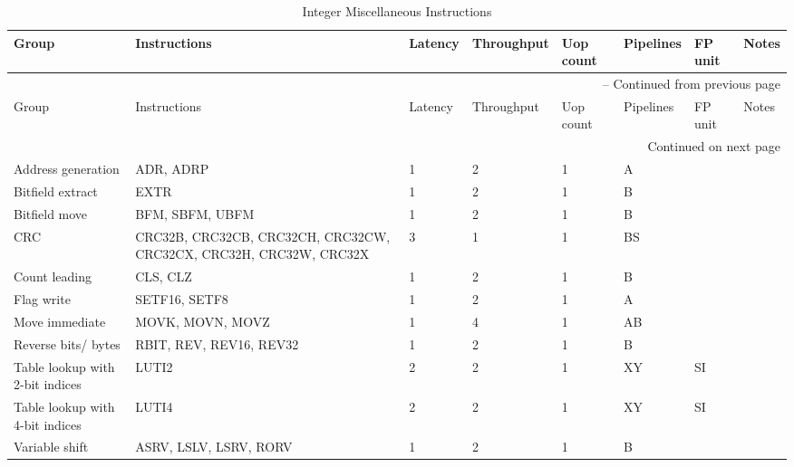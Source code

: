 \begin{longtable}{|p{1in}|p{1in}|l|l|l|p{1in}|l|p{1in}|}
\caption{Integer Miscellaneous Instructions} \\
\hline
Group & Instructions & Latency & Throughput & Uop count & Pipelines & FP unit & Notes\\
\hline
\endfirsthead
\hline
\multicolumn{8}{|r|}{{\tablename\ \thetable{} -- Continued from previous page}} \\
\hline
Group & Instructions & Latency & Throughput & Uop count & Pipelines & FP unit & Notes\\
\hline
\endhead
\hline
\multicolumn{8}{|r|}{{Continued on next page}} \\
\hline
\endfoot
\hline
\endlastfoot
Address generation & ADR, ADRP & 1 & 2 & 1 & A &  & \\
\hline
Bitfield extract & EXTR & 1 & 2 & 1 & B &  & \\
\hline
Bitfield move & BFM, SBFM, UBFM & 1 & 2 & 1 & B &  & \\
\hline
CRC & CRC32B, CRC32CB, CRC32CH, CRC32CW, CRC32CX, CRC32H, CRC32W, CRC32X & 3 & 1 & 1 & BS &  & \\
\hline
Count leading & CLS, CLZ & 1 & 2 & 1 & B &  & \\
\hline
Flag write & SETF16, SETF8 & 1 & 2 & 1 & A &  & \\
\hline
Move immediate & MOVK, MOVN, MOVZ & 1 & 4 & 1 & AB &  & \\
\hline
Reverse bits/ bytes & RBIT, REV, REV16, REV32 & 1 & 2 & 1 & B &  & \\
\hline
Table lookup with 2-bit indices & LUTI2 & 2 & 2 & 1 & XY & SI & \\
\hline
Table lookup with 4-bit indices & LUTI4 & 2 & 2 & 1 & XY & SI & \\
\hline
Variable shift & ASRV, LSLV, LSRV, RORV & 1 & 2 & 1 & B &  & \\
\hline
\end{longtable}
\newpage
